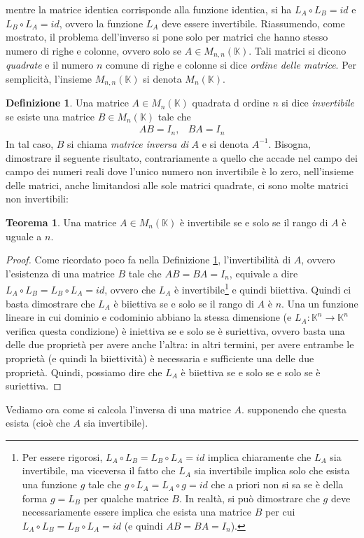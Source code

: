 \documentclass{book}
\theoremstyle{definition}
\newtheorem{defi}{Definizione}[section]
\newtheorem{teo}{Teorema}[section]
\theoremstyle{plain}
\begin{document}
mentre la matrice identica corrisponde alla funzione identica, si ha $L_A\circ L_B=id$ e $L_B\circ L_A=id$,
ovvero la funzione $L_A$ deve essere invertibile. Riassumendo, come mostrato, il problema dell'inverso si
pone solo per matrici che hanno stesso numero di righe e colonne, ovvero solo se $A\in M_{n,n}(\mathds{K})$.
Tali matrici si dicono \emph{quadrate} e il numero $n$ comune di righe e colonne si dice \textit{ordine delle
  matrice}. Per semplicità, l'insieme $M_{n,n}(\mathds{K})$ si denota $M_n(\mathds{K})$. 
\begin{defi}
  \label{defi:Compinveeproddimatrici1}
  Una matrice $A\in M_n(\mathds{K})$ quadrata d ordine $n$ si dice \textit{invertibile} se esiste una matrice
  $B\in M_n(\mathds{K})$ tale che
  \begin{eqnarray}
    \label{eq:Compinveeproddimatrici8}
    AB=I_n, & BA=I_n
  \end{eqnarray}
  In tal caso, $B$ si chiama \textit{matrice inversa di} $A$ e si denota $A^{-1}$. Bisogna, dimostrare il
  seguente risultato, contrariamente a quello che accade nel campo dei campo dei numeri reali dove l'unico
  numero non invertibile è lo zero, nell'insieme delle matrici, anche limitandosi alle sole matrici quadrate,
  ci sono molte matrici non invertibili:
\end{defi}
\begin{teo}
  \label{teo:Compinveeproddimatrici1}
  Una matrice $A\in M_n(\mathds{K})$ è invertibile se e solo se il rango di $A$ è uguale a $n$.
\end{teo}
\begin{proof}
  Come ricordato poco fa nella Definizione \ref{defi:Compinveeproddimatrici1}, l'invertibilità di $A$, ovvero
  l'esistenza di una matrice $B$ tale che $AB=BA=I_n$, equivale a dire $L_A\circ L_B=L_B\circ L_A=id$, ovvero
  che $L_A$ è invertibile\footnote{Per essere rigorosi, $L_A\circ L_B=L_B\circ L_A=id$ implica chiaramente che
    $L_A$ sia invertibile, ma viceversa il fatto che $L_A$ sia invertibile implica solo che esista una
    funzione $g$ tale che $g\circ L_A=L_A\circ g=id$ che a priori non si sa se è della forma $g=L_B$ per
    qualche matrice $B$. In realtà, si può dimostrare che $g$ deve necessariamente essere implica che esista
    una matrice $B$ per cui $L_A\circ L_B=L_B\circ L_A=id$ (e quindi $AB=BA=I_n$).} e quindi biiettiva. Quindi
  ci basta dimostrare che $L_A$ è biiettiva se e solo se il rango di $A$ è $n$. Una un funzione lineare in cui
  dominio e codominio abbiano la stessa dimensione (e $L_A:\mathds{K}^n\to \mathds{K}^n$ verifica questa
  condizione) è iniettiva se e solo se è suriettiva, ovvero basta una delle due proprietà per avere anche
  l'altra: in altri termini, per avere entrambe le proprietà
  (e quindi la biiettività) è necessaria e sufficiente una delle due
  proprietà. Quindi, possiamo dire che $L_A$ è biiettiva se e solo
  se e solo se è suriettiva. 
\end{proof}
Vediamo ora come si calcola l'inversa di una matrice $A$.
supponendo che questa esista (cioè che $A$ sia invertibile).
\end{document}
